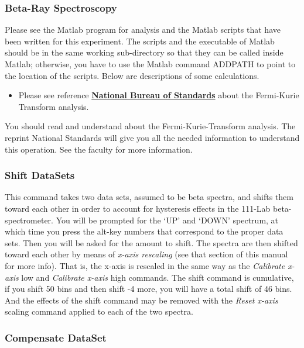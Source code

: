 \documentclass{../lab}
\begin{document}
\subsubsection{Beta-Ray Spectroscopy}

Please see the Matlab program for analysis and the Matlab scripts that have been written for this experiment. The scripts and the executable of Matlab should be in the same working sub-directory so that they can be called inside Matlab; otherwise, you have to use the Matlab command ADDPATH to point to the location of the scripts. Below are descriptions of some calculations.

\begin{itemize}
    \item Please see reference \href{http://physics111.lib.berkeley.edu/Physics111/Reprints/BRA/04-Table\_for\_Analysis\_of\_Beta\_Spectra.pdf}{\textbf{National Bureau of Standards}} about the Fermi-Kurie Transform analysis.

\end{itemize}

You should read and understand about the Fermi-Kurie-Transform analysis. The reprint National Standards will give you all the needed information to understand this operation. See the faculty for more information.

\subsubsection{Shift DataSets}

This command takes two data sets, assumed to be beta spectra, and shifts them toward each other in order to account for hysteresis effects in the 111-Lab beta-spectrometer. You will be prompted for the `UP' and `DOWN' spectrum, at which time you press the alt-key numbers that correspond to the proper data sets. Then you will be asked for the amount to shift. The spectra are then shifted toward each other by means of \emph{x-axis rescaling} (see that section of this manual for more info). That is, the x-axis is rescaled in the same way as the \emph{Calibrate x-axis} low and \emph{Calibrate x-axis} high commands. The shift command is cumulative, if you shift 50 bins and then shift -4 more, you will have a total shift of 46 bins. And the effects of the shift command may be removed with the \emph{Reset x-axis} scaling command applied to each of the two spectra.

\subsubsection{Compensate DataSet}
\end{document}
